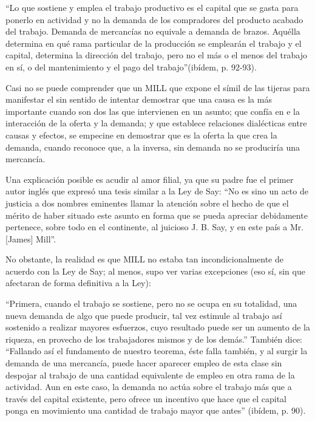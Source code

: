 \documentclass[10pt,a4paper]{article}
\begin{document}
“Lo que sostiene y emplea el trabajo productivo es el capital que se gasta para ponerlo en actividad y no la demanda de los compradores del producto acabado del trabajo. Demanda de mercancías no equivale a demanda de brazos. Aquélla determina en qué rama particular de la producción se emplearán el trabajo y el capital, determina la dirección del trabajo, pero no el más o el menos del trabajo en sí, o del mantenimiento y el pago del trabajo”(ibídem, p. 92-93). 

Casi no se puede comprender que un MILL que expone el símil de las tijeras para manifestar el sin sentido de intentar demostrar que una causa es la más importante cuando son dos las que intervienen en un asunto; que confía en e la interacción de la oferta y la demanda; y que establece relaciones dialécticas entre causas y efectos, se empecine en demostrar que es la oferta la que crea la demanda, cuando reconoce que, a la inversa, sin demanda no se produciría una mercancía. 

Una explicación posible es acudir al amor filial, ya que su padre fue el primer autor inglés que expresó una tesis similar a la Ley de Say: “No es sino un acto de justicia a dos nombres eminentes llamar la atención sobre el hecho de que el mérito de haber situado este asunto en forma que se pueda apreciar debidamente pertenece, sobre todo en el continente, al juicioso J. B. Say, y en este país a Mr. [James] Mill”. 

No obstante, la realidad es que MILL no estaba tan incondicionalmente de acuerdo con la Ley de Say; al menos, supo ver varias excepciones (eso sí, sin que afectaran de forma definitiva a la Ley): 

“Primera, cuando el trabajo se sostiene, pero no se ocupa en su totalidad, una nueva demanda de algo que puede producir, tal vez estimule al trabajo así sostenido a realizar mayores esfuerzos, cuyo resultado puede ser un aumento de la riqueza, en provecho de los trabajadores mismos y de los demás.” También dice: “Fallando así el fundamento de nuestro teorema, éste falla también, y al surgir la demanda de una mercancía, puede hacer aparecer empleo de esta clase sin despojar al trabajo de una cantidad equivalente de empleo en otra rama de la actividad. Aun en este caso, la demanda  no actúa sobre el trabajo más que a través del capital  existente, pero ofrece un incentivo que hace que el capital ponga en movimiento una cantidad de trabajo mayor que antes” (ibídem, p. 90). 
\end{document}
